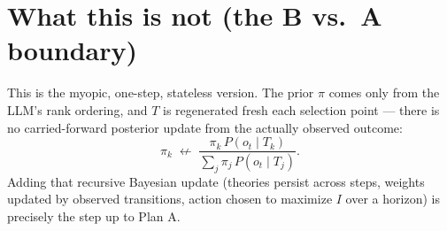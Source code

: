\documentclass[11pt]{article}
\begin{document}
\section*{What this is not (the B vs.\ A boundary)}

This is the myopic, one-step, stateless version. The prior $\pi$ comes only
from the LLM's rank ordering, and $T$ is regenerated fresh each selection point
--- there is no carried-forward posterior update from the actually observed
outcome:
\[
\pi_k \;\not\leftarrow\; \frac{\pi_k\, P(o_t \mid T_k)}{\sum_j \pi_j\, P(o_t \mid T_j)}.
\]
Adding that recursive Bayesian update (theories persist across steps, weights
updated by observed transitions, action chosen to maximize $I$ over a horizon)
is precisely the step up to Plan A.
\end{document}
